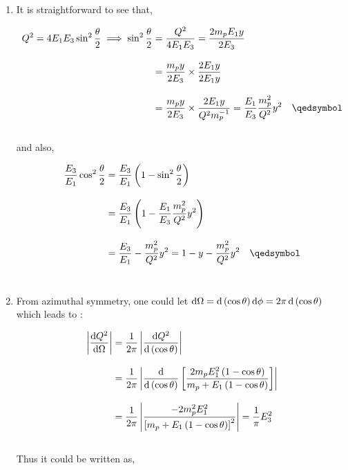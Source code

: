 \begin{solution}
    \begin{enumerate}[label=(\alph*)]
        \item It is straightforward to see that, 
            
            \begin{align*}
                Q^2 = 4E_1E_3\sin^2\frac{\theta}{2} \implies \sin^2 \frac{\theta}{2} &= \frac{Q^2}{4E_1E_3}  = \frac{2m_p E_{1}y}{2 E_3} \\[0.12in]
                &= \frac{m_p y}{2 E_3 } \times \frac{2E_1 y}{2 E_1 y}\\[0.12in]
                &= \frac{m_p y}{2 E_3} \times \frac{2E_1 y}{Q^2 m_p^{-1}} = \frac{E_1}{E_3} \frac{m_p^2}{Q^2}y^2 \qed
            \end{align*}\\
            and also,

            \begin{align*}
                \frac{E_3}{E_1}\cos^2\frac{\theta}{2} &= \frac{E_3}{E_1} \left(1 - \sin^2 \frac{\theta}{2}\right) \\[0.12in]
                &= \frac{E_3}{E_1} \left(  1 - \frac{E_1}{E_3} \frac{m_p^2}{Q^2}y^2  \right) \\[0.12in]
                &= \frac{E_3}{E_1} - \frac{m_p^2}{Q^2}y^2 = 1 - y - \frac{m_p^2}{Q^2}y^2 \qed
            \end{align*}\\
            \item From azimuthal symmetry, one could let $\mathop{}\!\mathrm{d} \Omega = \mathop{}\!\mathrm{d}\left(  \cos \theta \right) \mathop{}\!\mathrm{d} \phi = 2\pi \mathop{}\!\mathrm{d}\left(  \cos \theta \right)$ which leads to : 
            
                \begin{align*}
                    \left|\frac{\mathop{}\!\mathrm{d} Q^2}{ \mathop{}\!\mathrm{d} \Omega}\right| &= \frac{1}{2\pi} \left| \frac{\mathop{}\!\mathrm{d} Q^2}{ \mathop{}\!\mathrm{d} \left( \cos \theta \right)} \right| \\[0.12in]
                    &= \frac{1}{2\pi} \left| \frac{\mathop{}\!\mathrm{d}}{\mathop{}\!\mathrm{d} \left( \cos\theta \right)} \left[ \frac{2m_p E_1^2 \left( 1-\cos\theta \right)}{ m_p + E_1 \left( 1-\cos\theta \right) }  \right]\right| \\[0.12in]
                    &= \frac{1}{2\pi} \left| \frac{-2m_p^2 E_1^2}{\left[  m_p + E_1 \left( 1-\cos\theta \right) \right]^2} \right| = \frac{1}{\pi} E_3^2 
                \end{align*}\\
                Thus it could be written as, 


\end{enumerate}
\end{solution}
